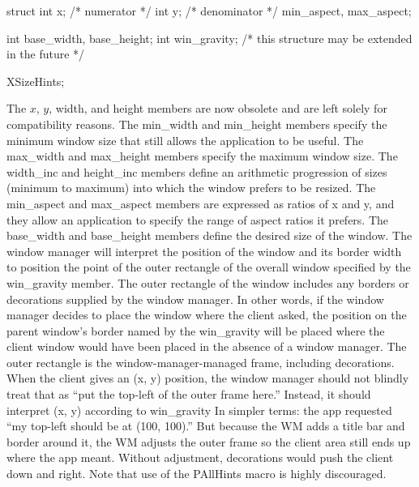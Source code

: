 \documentclass{report}
\begin{document}
\begin{itemize}
\begin{itemize}
\begin{cppcode}
{                    struct {
                        int x;                      /* numerator */
                        int y;                      /* denominator */
                    } min_aspect, max_aspect;

                    int base_width, base_height;
                    int win_gravity;
                    /* this structure may be extended in the future */
                } XSizeHints;
            \end{cppcode}
            \bigbreak \noindent 
            The $x$, $y$, width, and height members are now obsolete and are left solely for compatibility reasons. The min\_width and min\_height members specify the minimum window size that still allows the application to be useful. The max\_width and max\_height members specify the maximum window size. The width\_inc and height\_inc members define an arithmetic progression of sizes (minimum to maximum) into which the window prefers to be resized. The min\_aspect and max\_aspect members are expressed as ratios of x and y, and they allow an application to specify the range of aspect ratios it prefers. The base\_width and base\_height members define the desired size of the window. The window manager will interpret the position of the window and its border width to position the point of the outer rectangle of the overall window specified by the win\_gravity member. The outer rectangle of the window includes any borders or decorations supplied by the window manager. In other words, if the window manager decides to place the window where the client asked, the position on the parent window’s border named by the win\_gravity will be placed where the client window would have been placed in the absence of a window manager.
            \bigbreak \noindent 
            The outer rectangle is the window-manager-managed frame, including decorations.
            \bigbreak \noindent 
            When the client gives an (x, y) position, the window manager should not blindly treat that as “put the top-left of the outer frame here.” Instead, it should interpret (x, y) according to win\_gravity
            \bigbreak \noindent 
            In simpler terms: the app requested “my top-left should be at (100, 100).” But because the WM adds a title bar and border around it, the WM adjusts the outer frame so the client area still ends up where the app meant.
            \bigbreak \noindent 
            Without adjustment, decorations would push the client down and right.
            \bigbreak \noindent 
            Note that use of the PAllHints macro is highly discouraged. 

\end{itemize}
\end{itemize}
\end{document}
